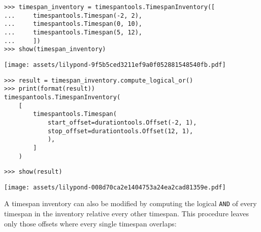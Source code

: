 \begin{comment}
<abjad>
timespan_inventory = timespantools.TimespanInventory([
    timespantools.Timespan(-2, 2),
    timespantools.Timespan(0, 10),
    timespantools.Timespan(5, 12),
    ])
show(timespan_inventory)
result = timespan_inventory.compute_logical_or()
print(format(result))
show(result)
</abjad>
\end{comment}

\begin{singlespacing}
\vspace{-0.5\baselineskip}
\begin{lstlisting}
>>> timespan_inventory = timespantools.TimespanInventory([
...     timespantools.Timespan(-2, 2),
...     timespantools.Timespan(0, 10),
...     timespantools.Timespan(5, 12),
...     ])
>>> show(timespan_inventory)
\end{lstlisting}
\noindent\texttt{[image: assets/lilypond-9f5b5ced3211ef9a0f052881548540fb.pdf]}
\begin{lstlisting}
>>> result = timespan_inventory.compute_logical_or()
>>> print(format(result))
timespantools.TimespanInventory(
    [
        timespantools.Timespan(
            start_offset=durationtools.Offset(-2, 1),
            stop_offset=durationtools.Offset(12, 1),
            ),
        ]
    )
\end{lstlisting}
\begin{lstlisting}
>>> show(result)
\end{lstlisting}
\noindent\texttt{[image: assets/lilypond-008d70ca2e1404753a24ea2cad81359e.pdf]}
\end{singlespacing}

\noindent A timespan inventory can also be modified by computing the logical
\texttt{AND} of every timespan in the inventory relative every other timespan.
This procedure leaves only those offsets where every single timespan
overlaps:

\begin{comment}
<abjad>
timespan_inventory = timespantools.TimespanInventory([
    timespantools.Timespan(-2, 8),
    timespantools.Timespan(0, 10),
    timespantools.Timespan(5, 12),
    ])
show(timespan_inventory)
result = timespan_inventory.compute_logical_and()
print(format(result))
show(result, range_=(-2, 12))
</abjad>
\end{comment}

